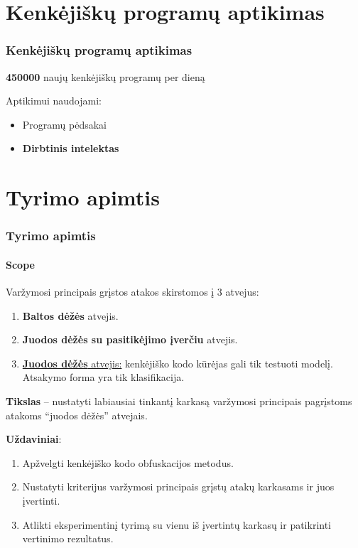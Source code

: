 \usepackage{VUMIF}
\usepackage[T1]{fontenc}



\begin{frame}
    \titlepage
\end{frame}

\section{Kenkėjiškų programų aptikimas}
\begin{frame}
    \frametitle{Kenkėjiškų programų aptikimas}
    \begin{center}
        \huge\textbf{450000} naujų kenkėjiškų programų per dieną \large{\cite{MalwareStatisticsTrendsa}}
    \end{center}\pause

    \vspace{40pt}
    Aptikimui naudojami:
    \begin{itemize}
        \item Programų pėdsakai\pause
        \item \textbf{Dirbtinis intelektas}
    \end{itemize}
\end{frame}

\section{Tyrimo apimtis}
\begin{frame}
    \frametitle{Tyrimo apimtis}
    \framesubtitle{Scope}

    Varžymosi principais grįstos atakos skirstomos į 3 atvejus:
    \begin{enumerate}
        \item \textbf{Baltos dėžės} atvejis.
        \item \textbf{Juodos dėžės su pasitikėjimo įverčiu} atvejis.
        \item \underline{\textbf{Juodos dėžės} atvejis:} kenkėjiško kodo kūrėjas gali tik testuoti modelį. Atsakymo forma yra tik klasifikacija.
    \end{enumerate} \pause
    \vspace{10pt}

    \textbf{Tikslas} -- nustatyti labiausiai tinkantį karkasą varžymosi principais pagrįstoms atakoms \enquote{juodos dėžės} atvejais. \pause

    \textbf{Uždaviniai}:
    \begin{enumerate}
        \item Apžvelgti kenkėjiško kodo obfuskacijos metodus.
        \item Nustatyti kriterijus varžymosi principais grįstų atakų karkasams ir juos
              įvertinti.
        \item Atlikti eksperimentinį tyrimą su vienu iš įvertintų karkasų ir patikrinti
              vertinimo rezultatus.
    \end{enumerate}

\end{frame}

